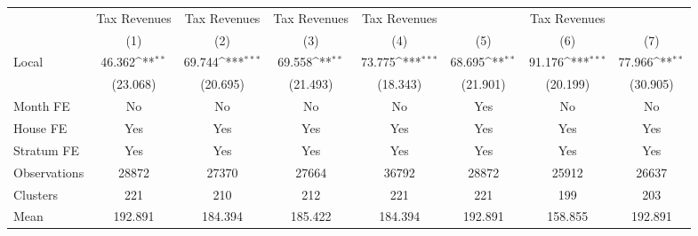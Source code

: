 {
\def\sym#1{\ifmmode^{#1}\else\(^{#1}\)\fi}
\begin{tabular}{l*{7}{c}}
\hline\hline
                &\multicolumn{1}{c}{Tax Revenues}&\multicolumn{1}{c}{Tax Revenues}&\multicolumn{1}{c}{Tax Revenues}&\multicolumn{1}{c}{Tax Revenues}&\multicolumn{3}{c}{Tax Revenues}                        \\
                &\multicolumn{1}{c}{(1)}         &\multicolumn{1}{c}{(2)}         &\multicolumn{1}{c}{(3)}         &\multicolumn{1}{c}{(4)}         &\multicolumn{1}{c}{(5)}         &\multicolumn{1}{c}{(6)}         &\multicolumn{1}{c}{(7)}         \\
\hline
Local           &   46.362\sym{**} &   69.744\sym{***}&   69.558\sym{**} &   73.775\sym{***}&   68.695\sym{**} &   91.176\sym{***}&   77.966\sym{**} \\
                & (23.068)         & (20.695)         & (21.493)         & (18.343)         & (21.901)         & (20.199)         & (30.905)         \\
Month FE        &       No         &       No         &       No         &       No         &      Yes         &       No         &       No         \\
House FE        &      Yes         &      Yes         &      Yes         &      Yes         &      Yes         &      Yes         &      Yes         \\
Stratum FE      &      Yes         &      Yes         &      Yes         &      Yes         &      Yes         &      Yes         &      Yes         \\
\hline
Observations    &    28872         &    27370         &    27664         &    36792         &    28872         &    25912         &    26637         \\
Clusters        &      221         &      210         &      212         &      221         &      221         &      199         &      203         \\
Mean            &  192.891         &  184.394         &  185.422         &  184.394         &  192.891         &  158.855         &  192.891         \\
\hline\hline
\end{tabular}
}
